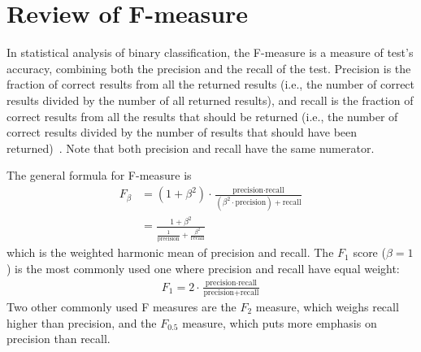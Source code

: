\chapter{Review of F-measure}\label{app:fmeasure}
In statistical analysis of binary classification, the F-measure is a measure of
test's accuracy, combining both the precision and the recall of the test.
Precision is the fraction of correct results from all the returned results
(i.e., the number of correct results divided by the number of all returned
results), and recall is the fraction of correct results from all the results
that should be returned (i.e., the number of correct results divided by the
number of results that should have been returned)~\cite{f1score14}. Note that
both precision and recall have the same numerator.

The general formula for F-measure is
\begin{align*}
F_\beta &= (1 + \beta^2)\cdot\frac{\text{precision}\cdot
\text{recall}}{(\beta^2\cdot\text{precision}) + \text{recall}}\\
&= \frac{1 + \beta^2}{\frac{1}{\text{precision}}+\frac{\beta^2}{\text{recall}}}
\end{align*}
which is the weighted harmonic mean of precision and recall. The $F_1$ score
($\beta=1$) is the most commonly used one where precision and recall have
equal weight:
\begin{align*}
F_1 = 2\cdot\frac{\text{precision}\cdot
\text{recall}}{\text{precision} + \text{recall}}
\end{align*}
Two other commonly used F measures are the $F_2$ measure, which weighs recall
higher than precision, and the $F_{0.5}$ measure, which puts more emphasis on
precision than recall.


